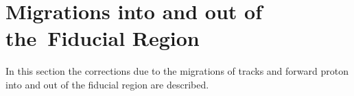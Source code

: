 \chapter{Migrations into and out of the~Fiducial Region}\label{section:star_migrations}
In this section the corrections due to the migrations of tracks and forward proton into and out of the fiducial region  are described.
%





